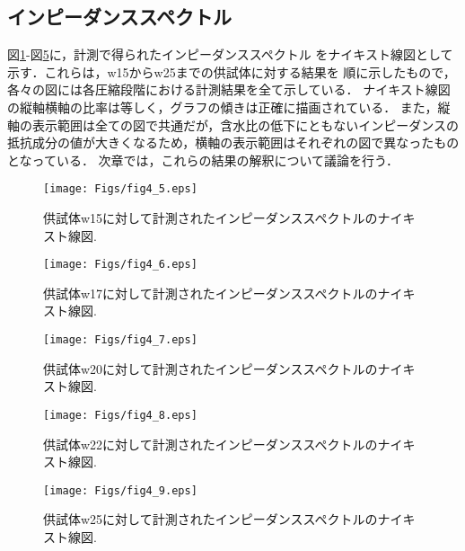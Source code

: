 \subsection{インピーダンススペクトル}
図\ref{fig:fig4_5}-図\ref{fig:fig4_9}に，計測で得られたインピーダンススペクトル
をナイキスト線図として示す．これらは，w15からw25までの供試体に対する結果を
順に示したもので，各々の図には各圧縮段階における計測結果を全て示している．
ナイキスト線図の縦軸横軸の比率は等しく，グラフの傾きは正確に描画されている．
また，縦軸の表示範囲は全ての図で共通だが，含水比の低下にともないインピーダンスの
抵抗成分の値が大きくなるため，横軸の表示範囲はそれぞれの図で異なったものとなっている．
次章では，これらの結果の解釈について議論を行う．
\begin{figure}[h]
	\begin{center}
	\texttt{[image: Figs/fig4\_5.eps]} 
	\end{center}
	\caption{
		供試体w15に対して計測されたインピーダンススペクトルのナイキスト線図.
	} 
	\label{fig:fig4_5}
\end{figure}
\begin{figure}[h]
	\begin{center}
	\texttt{[image: Figs/fig4\_6.eps]} 
	\end{center}
	\caption{
		供試体w17に対して計測されたインピーダンススペクトルのナイキスト線図.
	} 
	\label{fig:fig4_6}
\end{figure}
\begin{figure}[h]
	\begin{center}
	\texttt{[image: Figs/fig4\_7.eps]} 
	\end{center}
	\caption{
		供試体w20に対して計測されたインピーダンススペクトルのナイキスト線図.
	} 
	\label{fig:fig4_7}
\end{figure}
\begin{figure}[h]
	\begin{center}
	\texttt{[image: Figs/fig4\_8.eps]} 
	\end{center}
	\caption{
		供試体w22に対して計測されたインピーダンススペクトルのナイキスト線図.
	} 
	\label{fig:fig4_8}
\end{figure}
\begin{figure}[h]
	\begin{center}
	\texttt{[image: Figs/fig4\_9.eps]} 
	\end{center}
	\caption{
		供試体w25に対して計測されたインピーダンススペクトルのナイキスト線図.
	} 
	\label{fig:fig4_9}
\end{figure}
